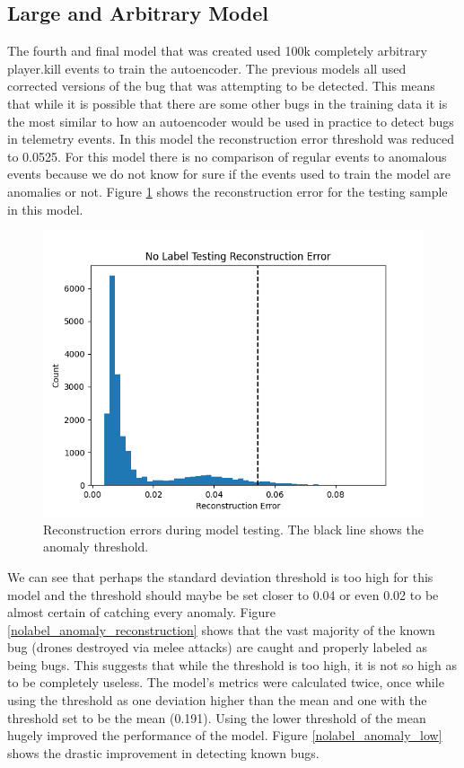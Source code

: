 \documentclass[a4paper,11pt]{article}
\begin{document}
\subsection{Large and Arbitrary Model}
The fourth and final model that was created used 100k completely arbitrary player.kill events to train the autoencoder. The previous models all used corrected versions of the bug that was attempting to be detected. This means that while it is possible that there are some other bugs in the training data it is the most similar to how an autoencoder would be used in practice to detect bugs in telemetry events. In this model the reconstruction error threshold was reduced to 0.0525. For this model there is no comparison of regular events to anomalous events because we do not know for sure if the events used to train the model are anomalies or not. Figure \ref{nolabel_test_reconstruction} shows the reconstruction error for the testing sample in this model.
\begin{figure}[H]
\centering
\includegraphics[width=.8\textwidth]{nolabel_test_reconstruction.png}
\caption{Reconstruction errors during model testing. The black line shows the anomaly threshold.}
\label{nolabel_test_reconstruction}
\end{figure}
We can see that perhaps the standard deviation threshold is too high for this model and the threshold should maybe be set closer to 0.04 or even 0.02 to be almost certain of catching every anomaly. Figure \ref{nolabel_anomaly_reconstruction} shows that the vast majority of the known bug (drones destroyed via melee attacks) are caught and properly labeled as being bugs. This suggests that while the threshold is too high, it is not so high as to be completely useless. The model's metrics were calculated twice, once while using the threshold as one deviation higher than the mean and one with the threshold set to be the mean (0.191). Using the lower threshold of the mean hugely improved the performance of the model. Figure \ref{nolabel_anomaly_low} shows the drastic improvement in detecting known bugs.
\end{document}
